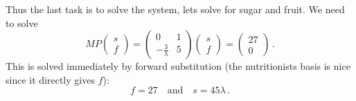 {Thus the last task is to solve the system, lets solve for sugar and fruit. 
We need to solve
\[
MP\begin{pmatrix} s \\  f\end{pmatrix}
=\begin{pmatrix}0& 1\\ -\frac3\lambda & 5
\end{pmatrix}
\begin{pmatrix} s \\  f\end{pmatrix}
=\begin{pmatrix}27\\0\end{pmatrix}
\, .
\]
This is solved immediately by forward substitution (the nutritionists basis is nice since it directly gives $f$):
\[
f=27\quad \mbox{and} \quad s= 45\lambda\, .
\]

} %


